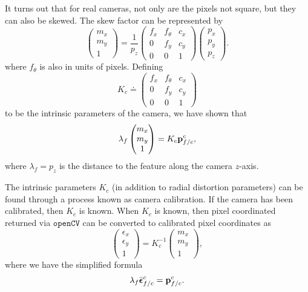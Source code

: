 It turns out that for real cameras, not only are the pixels not square, but they can also be skewed.  The skew factor can be represented by\cite{MaSoattoKoseckaSastry03}
\[
\begin{pmatrix}m_x \\ m_y \\ 1\end{pmatrix} 
	= \frac{1}{p_z}\begin{pmatrix} f_x & f_\theta & c_x \\ 0 & f_y & c_y \\ 0 & 0 & 1 \end{pmatrix}\begin{pmatrix}p_x \\ p_y \\ p_z \end{pmatrix}.
\]
where $f_\theta$ is also in units of pixels.  
Defining 
\[
K_c \doteq \begin{pmatrix}f_x & f_\theta & c_x \\ 0 & f_y & c_y \\ 0 & 0 & 1\end{pmatrix}
\]
to be the intrinsic parameters of the camera, we have shown that 
\begin{equation}\label{eq:pin_hole_pixel}
\lambda_f \begin{pmatrix} m_x \\ m_y \\ 1 \end{pmatrix} = K_c \pbf_{f/c}^c,
\end{equation}
where $\lambda_f = p_z$ is the distance to the feature along the camera $z$-axis.  

The intrinsic parameters $K_c$ (in addition to radial distortion parameters) can be found through a process known as camera calibration.  If the camera has been calibrated, then $K_c$ is known.  When $K_c$ is known, then pixel coordinated returned via $\texttt{openCV}$ can be converted to calibrated pixel coordinates as 
\begin{equation}\label{eq:calibrated_normalized_homogeneous_coord}
\begin{pmatrix} \epsilon_x \\ \epsilon_y \\ 1 \end{pmatrix} = K_c^{-1} \begin{pmatrix} m_x \\ m_y \\ 1 \end{pmatrix},
\end{equation}
where we have the simplified formula
\[
\lambda_f \bar{\boldsymbol{\epsilon}}_{f/c}^c = \mathbf{p}_{f/c}^c.
\]

